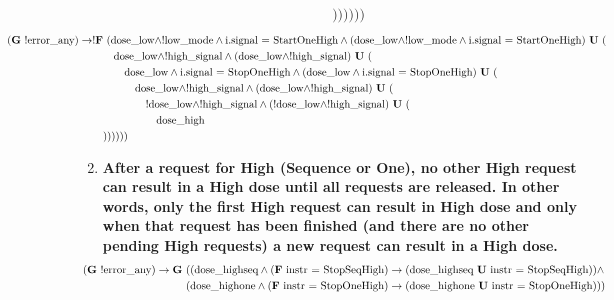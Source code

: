 \documentclass[a4paper,10pt]{article}
\newcommand{\LTLG}{\mathbf{G~}}
\newcommand{\LTLF}{\mathbf{F~}}
\newcommand{\LTLU}{\mathbf{~U~}}
\newcommand{\imply}{\rightarrow}
\newcommand{\doselow}{\textrm{dose\_low}}
\newcommand{\dosehigh}{\textrm{dose\_high}}
\newcommand{\dosehighseq}{\textrm{dose\_highseq}}
\newcommand{\dosehighone}{\textrm{dose\_highone}}
\newcommand{\highsignal}{\textrm{high\_signal}}
\newcommand{\errorany}{\textrm{error\_any}}
\newcommand{\lowmode}{\textrm{low\_mode}}
\begin{document}
\begin{enumerate}
\begin{align*}
				&))))))
			\end{align*}
			\begin{align*}
				&\hspace{-9em}(\LTLG !\errorany) \imply !\LTLF (\doselow \land !\lowmode \land \textrm{i.signal = StartOneHigh} \land (\doselow \land !\lowmode \land \textrm{i.signal = StartOneHigh}) \LTLU ( \\
				&	\hspace{1em}\doselow \land !\highsignal \land (\doselow \land !\highsignal) \LTLU ( \\
				&		\hspace{2em}\doselow \land \textrm{i.signal = StopOneHigh} \land (\doselow \land \textrm{i.signal = StopOneHigh}) \LTLU ( \\
				&			\hspace{3em}\doselow \land !\highsignal \land (\doselow \land !\highsignal) \LTLU ( \\
				&				\hspace{4em}!\doselow \land !\highsignal \land (!\doselow \land !\highsignal) \LTLU ( \\
				&					\hspace{5em}\dosehigh \\
				&))))))
			\end{align*}

		\item \textbf{After a request for High (Sequence or One), no other High request can result in a High dose until all requests are released. In other words, only the first High request can result in High dose and only when that request has been finished (and there are no other pending High requests) a new request can result in a High dose.}
			\begin{align*}
				\hspace{-2em}(\LTLG !\errorany) \imply \LTLG &((\dosehighseq \land (\LTLF \textrm{instr = StopSeqHigh}) \imply (\dosehighseq \LTLU \textrm{instr = StopSeqHigh})) \land \\
					&(\dosehighone \land (\LTLF \textrm{instr = StopOneHigh}) \imply (\dosehighone \LTLU \textrm{instr = StopOneHigh})))
			\end{align*}


\end{enumerate}
\end{document}
